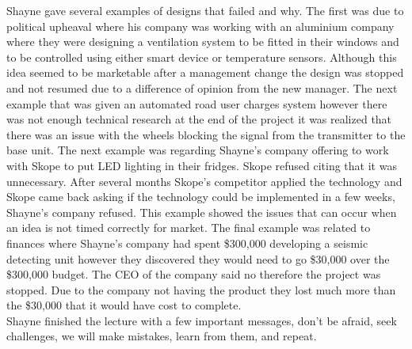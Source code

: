 \documentclass{article}
\begin{document}
Shayne gave several examples of designs that failed and why. The first was due to political upheaval
where his company was working with an aluminium company where they were designing a ventilation
system to be fitted in their windows and to be controlled using either smart device or temperature
sensors. Although this idea seemed to be marketable after a management change the design was stopped
and not resumed due to a difference of opinion from the new manager. The next example that was given
an automated road user charges system however there was not enough technical research at the end of
the project it was realized that there was an issue with the wheels blocking the signal from the
transmitter to the base unit. The next example was regarding Shayne's company offering to work with
Skope to put LED lighting in their fridges. Skope refused citing that it was unnecessary. After
several months Skope's competitor applied the technology and Skope came back asking if the
technology could be implemented in a few weeks, Shayne's company refused. This example showed the
issues that can occur when an idea is not timed correctly for market. The final example was related
to finances where Shayne's company had spent \$300,000 developing a seismic detecting unit however
they discovered they would need to go \$30,000 over the \$300,000 budget. The CEO of the company
said no therefore the project was stopped. Due to the company not having the product they lost much
more than the \$30,000 that it would have cost to complete.\\ 

Shayne finished the lecture with a few important messages, don't be afraid, seek challenges, we will
make mistakes, learn from them, and repeat.
\end{document}
